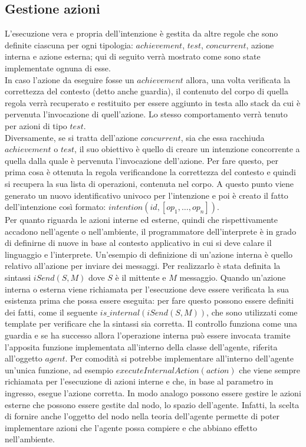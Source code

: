 \subsection{Gestione azioni}
L'esecuzione vera e propria dell'intenzione è gestita da altre regole che sono definite ciascuna per ogni tipologia: $achievement$, $test$, $concurrent$, azione interna e azione esterna; qui di seguito verrà mostrato come sono state implementate ognuna di esse.
\\
In caso l'azione da eseguire fosse un $achievement$ allora, una volta verificata la correttezza del contesto (detto anche guardia), il contenuto del corpo di quella regola verrà recuperato e restituito per essere aggiunto in testa allo stack da cui è pervenuta l'invocazione di quell'azione. Lo stesso comportamento verrà tenuto per azioni di tipo $test$.
\\
Diversamente, se si tratta dell'azione $concurrent$, sia che essa racchiuda $achievement$ o $test$, il suo obiettivo è quello di creare un intenzione concorrente a quella dalla quale è pervenuta l'invocazione dell'azione. Per fare questo, per prima cosa è ottenuta la regola verificandone la correttezza del contesto e quindi si recupera la sua lista di operazioni, contenuta nel corpo. A questo punto viene generato un nuovo identificativo univoco per l'intenzione e poi è creato il fatto dell'intenzione così formato: $intention(id, [op_1, \ldots, op_n])$.
\\
Per quanto riguarda le azioni interne ed esterne, quindi che rispettivamente accadono nell'agente o nell'ambiente, il programmatore dell'interprete è in grado di definirne di nuove in base al contesto applicativo in cui si deve calare il linguaggio e l'interprete. Un'esempio di definizione di un'azione interna è quello relativo all'azione per inviare dei messaggi. Per realizzarlo è stata definita la sintassi $iSend(S,M)$ dove $S$ è il mittente e $M$ messaggio. Quando un'azione interna o esterna viene richiamata per l'esecuzione deve essere verificata la sua esistenza prima che possa essere eseguita: per fare questo possono essere definiti dei fatti, come il seguente $is\_internal(iSend(S,M))$, che sono utilizzati come template per verificare che la sintassi sia corretta. Il controllo funziona come una guardia e se ha successo allora l'operazione interna può essere invocata tramite l'apposita funzione implementata all'interno della classe dell'agente, riferita all'oggetto $agent$. Per comodità si potrebbe implementare all'interno dell'agente un'unica funzione, ad esempio $executeInternalAction(action)$ che viene sempre richiamata per l'esecuzione di azioni interne e che, in base al parametro in ingresso, esegue l'azione corretta.
In modo analogo possono essere gestire le azioni esterne che possono essere gestite dal nodo, lo spazio dell'agente. Infatti, la scelta di fornire anche l'oggetto del nodo nella teoria dell'agente permette di poter implementare azioni che l'agente possa compiere e che abbiano effetto nell'ambiente.

